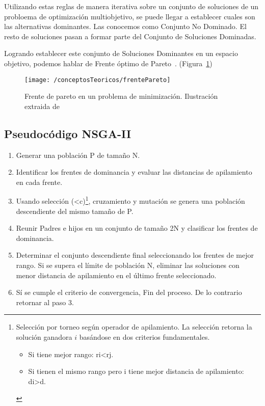 Utilizando estas reglas de manera iterativa sobre un conjunto de soluciones de un probloema de optimización multiobjetivo, se puede llegar a establecer cuales son las alternativas dominantes. Las conocemos como Conjunto No Dominado.
El resto de soluciones pasan a formar parte del Conjunto de Soluciones Dominadas. 

Logrando establecer este conjunto de Soluciones Dominantes en un espacio objetivo, podemos hablar de Frente óptimo de Pareto~\cite{img:frente_pareto}. (Figura~\ref{fig:frentePareto})

\begin{figure}[ht]
	\centering
	\texttt{[image: /conceptosTeoricos/frentePareto]}
	\caption{Frente de pareto en un problema de minimización. Ilustración extraida de~\cite{img:frente_pareto}}
	\label{fig:frentePareto}
\end{figure}

\subsection{Pseudocódigo NSGA-II \cite{pdf:nsga-ii}}

\begin{enumerate}
	\item Generar una población P de tamaño N. 
	\item Identificar los frentes de dominancia y evaluar las 
	distancias de apilamiento en cada frente. 
	\item Usando selección (<c)\footnote{Selección por torneo según operador de 
		apilamiento. La selección retorna la solución ganadora $i$ basándose en 
		dos criterios fundamentales.  
		\begin{itemize}
			\item Si tiene mejor rango: ri<rj.
			\item Si tienen el mismo rango pero i tiene mejor distancia de apilamiento: di>d.
		\end{itemize}
	}, cruzamiento y mutación se 
	genera una población descendiente del mismo 
	tamaño de P.  	
	\item Reunir Padres e hijos en un conjunto de tamaño 2N y 
	clasificar los frentes de dominancia. 
	\item Determinar el conjunto descendiente final 
	seleccionando los frentes de mejor rango. Si se 
	supera el límite de población N, eliminar las 
	soluciones con menor distancia de apilamiento en el 
	último frente seleccionado. 
	\item Sí se cumple el criterio de convergencia, Fin del 
	proceso. De lo contrario retornar al paso 3.
\end{enumerate}